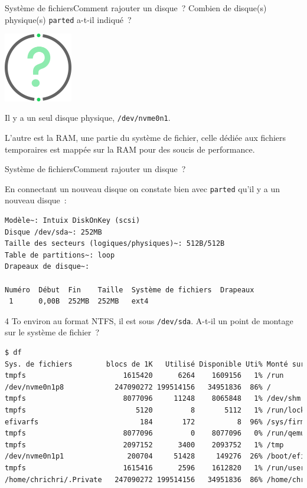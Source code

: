 \documentclass{beamer}
\begin{document}
    \begin{frame}{Système de fichiers}{Comment rajouter un disque~?}
        Combien de disque(s) physique(s) \lstinline{parted} a-t-il indiqué~?
        \begin{center}
            \includegraphics[width=3cm]{image/question-mark}
        \end{center}
        \pause
        \begin{dangercolorbox}
            Il y a un seul disque physique, \lstinline{/dev/nvme0n1}.

            L'autre est la RAM, une partie du système de fichier, celle dédiée aux fichiers temporaires est mappée sur la RAM pour des soucis de performance.
        \end{dangercolorbox}
    \end{frame}

    \begin{frame}[fragile]{Système de fichiers}{Comment rajouter un disque~?}
        \begin{scriptsize}
            En connectant un nouveau disque on constate bien avec \lstinline{parted} qu'il y a un nouveau disque~:
            \begin{lstlisting}[basicstyle=\tiny\ttfamily]
Modèle~: Intuix DiskOnKey (scsi)
Disque /dev/sda~: 252MB
Taille des secteurs (logiques/physiques)~: 512B/512B
Table de partitions~: loop
Drapeaux de disque~:

Numéro  Début  Fin    Taille  Système de fichiers  Drapeaux
 1      0,00B  252MB  252MB   ext4
            \end{lstlisting}
            4 To environ au format NTFS, il est sous \lstinline{/dev/sda}.
            A-t-il un point de montage sur le système de fichier~?
            \begin{lstlisting}[language=bash,basicstyle=\tiny\ttfamily]
$ df
Sys. de fichiers        blocs de 1K   Utilisé Disponible Uti% Monté sur
tmpfs                       1615420      6264    1609156   1% /run
/dev/nvme0n1p8            247090272 199514156   34951836  86% /
tmpfs                       8077096     11248    8065848   1% /dev/shm
tmpfs                          5120         8       5112   1% /run/lock
efivarfs                        184       172          8  96% /sys/firmware/efi/efivars
tmpfs                       8077096         0    8077096   0% /run/qemu
tmpfs                       2097152      3400    2093752   1% /tmp
/dev/nvme0n1p1               200704     51428     149276  26% /boot/efi
tmpfs                       1615416      2596    1612820   1% /run/user/1000
/home/chrichri/.Private   247090272 199514156   34951836  86% /home/chrichri/Private
            \end{lstlisting}
        \end{scriptsize}
    \end{frame}
\end{document}
